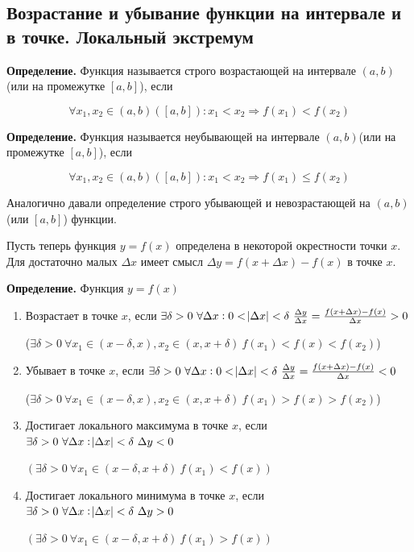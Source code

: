 \documentclass{article}
\begin{document}
\subsection{Возрастание и убывание функции на интервале и в точке. Локальный экстремум}

\textbf{Определение.} Функция называется строго возрастающей на интервале \((a, b)\)(или на промежутке \([a, b]\)), если

\[\forall x_1, x_2 \in (a,b)([a,b]): x_1 < x_2 \Rightarrow f(x_1) < f(x_2)\]

\textbf{Определение.} Функция называется неубывающей на интервале \((a, b)\)(или на промежутке \([a, b]\)), если

\[\forall x_1, x_2 \in (a, b)([a, b]): x_1 < x_2 \Rightarrow f(x_1) \leq f(x_2)\]

Аналогично давали определение строго убывающей и невозрастающей на \((a, b)\)(или \([a,b]\)) функции.

Пусть теперь функция \(y = f(x)\) определена в некоторой окрестности точки \(x\). Для достаточно малых \(\Delta x\) имеет смысл \(\Delta y = f(x+\Delta x) - f(x)\) в точке \(x\).

\textbf{Определение.} Функция \(y = f(x)\)

\begin{enumerate}
    \item Возрастает в точке \(x\), если \(\exists \delta > 0\ \forall \Delta x: 0 < \abs{\Delta x} < \delta\ \frac{\Delta y}{\Delta x} = \frac{f(x+\Delta x)-f(x)}{\Delta x} > 0\)
    
    (\(\exists \delta > 0\ \forall x_1 \in (x-\delta, x), x_2 \in (x, x + \delta)\ f(x_1) < f(x) < f(x_2)\))
    \item Убывает в точке \(x\), если \(\exists \delta > 0\ \forall \Delta x: 0 < \abs{\Delta x} < \delta\ \frac{\Delta y}{\Delta x} = \frac{f(x+\Delta x)-f(x)}{\Delta x} < 0\)
    
    (\(\exists \delta > 0\ \forall x_1 \in (x-\delta, x), x_2 \in (x, x + \delta)\ f(x_1) > f(x) > f(x_2)\))
    \item Достигает локального максимума в точке \(x\), если \(\exists \delta > 0\ \forall \Delta x: \abs{\Delta x} < \delta\ \Delta y < 0\) 
    
    \((\exists \delta > 0\ \forall x_1 \in (x - \delta, x + \delta)\ f(x_1) < f(x))\)
    \item Достигает локального минимума в точке \(x\), если \(\exists \delta > 0\ \forall \Delta x: \abs{\Delta x} < \delta\ \Delta y > 0\) 
    
    \((\exists \delta > 0\ \forall x_1 \in (x - \delta, x + \delta)\ f(x_1) > f(x))\)
\end{enumerate}
\end{document}
